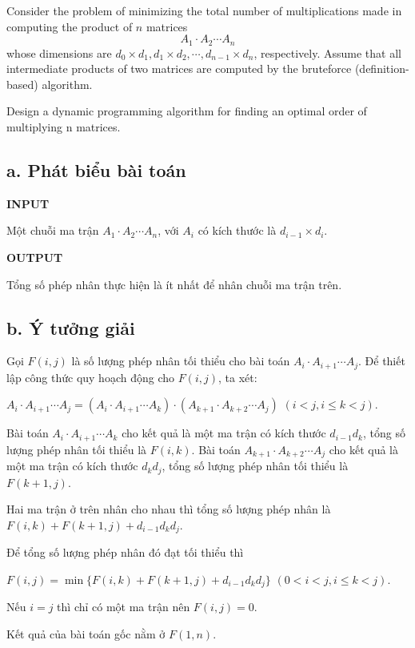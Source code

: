 \documentclass[12pt, a4paper, fleqn]{article}
\begin{document}
	Consider the problem of minimizing the total number of multiplications made in computing the product of $n$ matrices
	$$A_1 \cdot A_2 \cdots A_n$$
	whose dimensions are $d_0 \times d_1, d_1 \times d_2, \cdots , d_{n - 1} \times d_n$, respectively. Assume that all intermediate products of two matrices are computed by the bruteforce (definition-based) algorithm.
	
	Design a dynamic programming algorithm for finding an optimal order of multiplying n matrices.
	
	\subsection*{a. Phát biểu bài toán}
	
	\textbf{INPUT}
	
	Một chuỗi ma trận $A_1 \cdot A_2 \cdots A_n$, với $A_i$ có kích thước là $d_{i - 1} \times d_i$.
	
	\textbf{OUTPUT}
	
	Tổng số phép nhân thực hiện là ít nhất để nhân chuỗi ma trận trên.
	
	\subsection*{b. Ý tưởng giải}
	
	Gọi $F(i, j)$ là số lượng phép nhân tối thiểu cho bài toán $A_i \cdot A_{i + 1} \cdots A_j$. Để thiết lập công thức quy hoạch động cho $F(i, j)$, ta xét:
	
	$A_i \cdot A_{i + 1} \cdots A_j = (A_i \cdot A_{i + 1}  \cdots A_k) \cdot (A_{k + 1} \cdot A_{k + 2} \cdots A_j)$ $(i < j, i \leq k < j)$.
	
	Bài toán $A_i \cdot A_{i + 1}  \cdots A_k$ cho kết quả là một ma trận có kích thước $d_{i - 1}d_k$, tổng số lượng phép nhân tối thiểu là $F(i, k)$. Bài toán $A_{k + 1} \cdot A_{k + 2}  \cdots A_j$ cho kết quả là một ma trận có kích thước $d_kd_j$, tổng số lượng phép nhân tối thiểu là $F(k + 1, j)$.
	
	Hai ma trận ở trên nhân cho nhau thì tổng số lượng phép nhân là $F(i, k) + F(k + 1, j) + d_{i - 1}d_kd_j$.
	
	Để tổng số lượng phép nhân đó đạt tối thiểu thì
	
	$F(i, j) = \min\{F(i, k) + F(k + 1, j) + d_{i - 1}d_kd_j\}$ $(0 < i < j, i \leq k < j)$.
	
	Nếu $i = j$ thì chỉ có một ma trận nên $F(i ,j) = 0$.
	
	Kết quả của bài toán gốc nằm ở $F(1, n)$.
	
\end{document}
